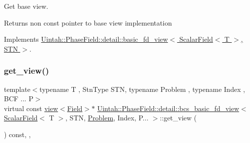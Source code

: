 Get base view. 

\begin{DoxyReturn}{Returns}
non const pointer to base view implementation 
\end{DoxyReturn}


Implements \hyperlink{classUintah_1_1PhaseField_1_1detail_1_1basic__fd__view_3_01ScalarField_3_01T_01_4_00_01STN_01_4_a2bbf870b332cfd997ec5297428019bc8}{Uintah\+::\+Phase\+Field\+::detail\+::basic\+\_\+fd\+\_\+view$<$ Scalar\+Field$<$ T $>$, S\+T\+N $>$}.

\mbox{\label{classUintah_1_1PhaseField_1_1detail_1_1bcs__basic__fd__view_3_01ScalarField_3_01T_01_4_00_01STN_07caa9955adf783da0505eac75e76f08_a0aae05fb5f6751eddd0c5d5713512669}} 
\subsubsection{\texorpdfstring{get\+\_\+view()}{get\_view()}\hspace{0.1cm}{\footnotesize\ttfamily [2/2]}}
{\footnotesize\ttfamily template$<$typename T , Stn\+Type S\+TN, typename Problem , typename Index , B\+C\+F ... P$>$ \\
virtual const \hyperlink{classUintah_1_1PhaseField_1_1detail_1_1view}{view}$<$\hyperlink{structUintah_1_1PhaseField_1_1ScalarField}{Field}$>$$\ast$ \hyperlink{classUintah_1_1PhaseField_1_1detail_1_1bcs__basic__fd__view}{Uintah\+::\+Phase\+Field\+::detail\+::bcs\+\_\+basic\+\_\+fd\+\_\+view}$<$ \hyperlink{structUintah_1_1PhaseField_1_1ScalarField}{Scalar\+Field}$<$ T $>$, S\+TN, \hyperlink{classUintah_1_1PhaseField_1_1Problem}{Problem}, Index, P... $>$\+::get\+\_\+view (\begin{DoxyParamCaption}{ }\end{DoxyParamCaption}) const\hspace{0.3cm}{\ttfamily [inline]}, {\ttfamily [override]}, {\ttfamily [virtual]}}



